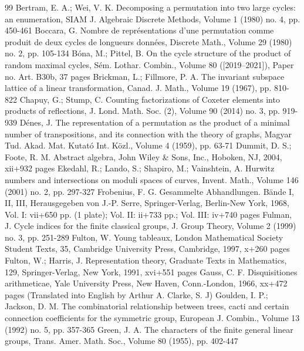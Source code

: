 \documentclass[10pt]{article}
\theoremstyle{definition}
\begin{document}
\begin{thebibliography}{99}
Bertram, E. A.; Wei, V. K. Decomposing a permutation into two large cycles: an enumeration, SIAM J. Algebraic Discrete Methods, Volume 1 (1980) no. 4, pp. 450-461
Boccara, G. Nombre de représentations d’une permutation comme produit de deux cycles de longueurs données, Discrete Math., Volume 29 (1980) no. 2, pp. 105-134
Bóna, M.; Pittel, B. On the cycle structure of the product of random maximal cycles, Sém. Lothar. Combin., Volume 80 ([2019–2021]), Paper no. Art. B30b, 37 pages
Brickman, L.; Fillmore, P. A. The invariant subspace lattice of a linear transformation, Canad. J. Math., Volume 19 (1967), pp. 810-822
Chapuy, G.; Stump, C. Counting factorizations of Coxeter elements into products of reflections, J. Lond. Math. Soc. (2), Volume 90 (2014) no. 3, pp. 919-939
Dénes, J. The representation of a permutation as the product of a minimal number of transpositions, and its connection with the theory of graphs, Magyar Tud. Akad. Mat. Kutató Int. Közl., Volume 4 (1959), pp. 63-71
Dummit, D. S.; Foote, R. M. Abstract algebra, John Wiley \& Sons, Inc., Hoboken, NJ, 2004, xii+932 pages
Ekedahl, R.; Lando, S.; Shapiro, M.; Vainshtein, A. Hurwitz numbers and intersections on moduli spaces of curves, Invent. Math., Volume 146 (2001) no. 2, pp. 297-327
Frobenius, F. G. Gesammelte Abhandlungen. Bände I, II, III, Herausgegeben von J.-P. Serre, Springer-Verlag, Berlin-New York, 1968, Vol. I: vii+650 pp. (1 plate); Vol. II: ii+733 pp.; Vol. III: iv+740 pages
Fulman, J. Cycle indices for the finite classical groups, J. Group Theory, Volume 2 (1999) no. 3, pp. 251-289
Fulton, W. Young tableaux, London Mathematical Society Student Texts, 35, Cambridge University Press, Cambridge, 1997, x+260 pages
Fulton, W.; Harris, J. Representation theory, Graduate Texts in Mathematics, 129, Springer-Verlag, New York, 1991, xvi+551 pages
Gauss, C. F. Disquisitiones arithmeticae, Yale University Press, New Haven, Conn.-London, 1966, xx+472 pages (Translated into English by Arthur A. Clarke, S. J)
Goulden, I. P.; Jackson, D. M. The combinatorial relationship between trees, cacti and certain connection coefficients for the symmetric group, European J. Combin., Volume 13 (1992) no. 5, pp. 357-365
Green, J. A. The characters of the finite general linear groups, Trans. Amer. Math. Soc., Volume 80 (1955), pp. 402-447

\end{thebibliography}
\end{document}
